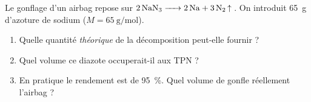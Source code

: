 \documentclass[11pt,a4paper]{article}
\begin{document}
\begin{exo}
Le gonflage d'un airbag repose sur $\ce{2 NaN3 -> 2 Na + 3 N2 ^}$. On introduit \qty{65}{\gram} d'azoture
de sodium  ($M=\qty{65}{\gram\per\mole}$).
\begin{enumerate}[label=\alph*)]
  \item Quelle quantité \emph{théorique} de  la décomposition peut-elle fournir ?
  \item Quel volume ce diazote occuperait-il aux TPN ?
  \item En pratique le rendement est de \qty{95}{\percent}. Quel volume de  gonfle réellement l'airbag ?
\end{enumerate}
\end{exo}
\end{document}
